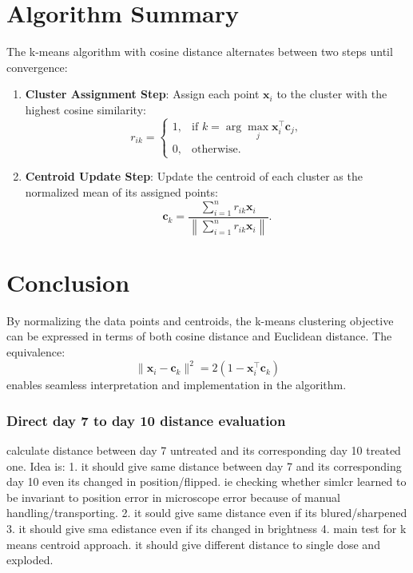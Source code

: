 \section*{Algorithm Summary}

The k-means algorithm with cosine distance alternates between two steps until convergence:

\begin{enumerate}
    \item \textbf{Cluster Assignment Step}: Assign each point \( \mathbf{x}_i \) to the cluster with the highest cosine similarity:
    \[
    r_{ik} =
    \begin{cases}
    1, & \text{if } k = \arg\max_{j} \mathbf{x}_i^\top \mathbf{c}_j, \\
    0, & \text{otherwise.}
    \end{cases}
    \]

    \item \textbf{Centroid Update Step}: Update the centroid of each cluster as the normalized mean of its assigned points:
    \[
    \mathbf{c}_k = \frac{\sum_{i=1}^{n} r_{ik} \mathbf{x}_i}{\left\| \sum_{i=1}^{n} r_{ik} \mathbf{x}_i \right\|}.
    \]
\end{enumerate}

\section*{Conclusion}

By normalizing the data points and centroids, the k-means clustering objective can be expressed in terms of both cosine distance and Euclidean distance. The equivalence:
\[
\|\mathbf{x}_i - \mathbf{c}_k\|^2 = 2(1 - \mathbf{x}_i^\top \mathbf{c}_k)
\]
enables seamless interpretation and implementation in the algorithm.








\subsubsection{Direct day 7 to day 10 distance evaluation}
calculate distance between day 7 untreated and its corresponding day 10 treated one.
Idea is:
1. it should give same distance between day 7 and its corresponding day 10
 even its changed in position/flipped. ie checking whether simlcr learned to 
 be invariant to position error in microscope error because of manual 
 handling/transporting.
2. it sould give same distance even if its blured/sharpened
3. it should give sma edistance even if its changed in brightness
4. main test for k means centroid approach. it should give different distance to single dose and exploded.

